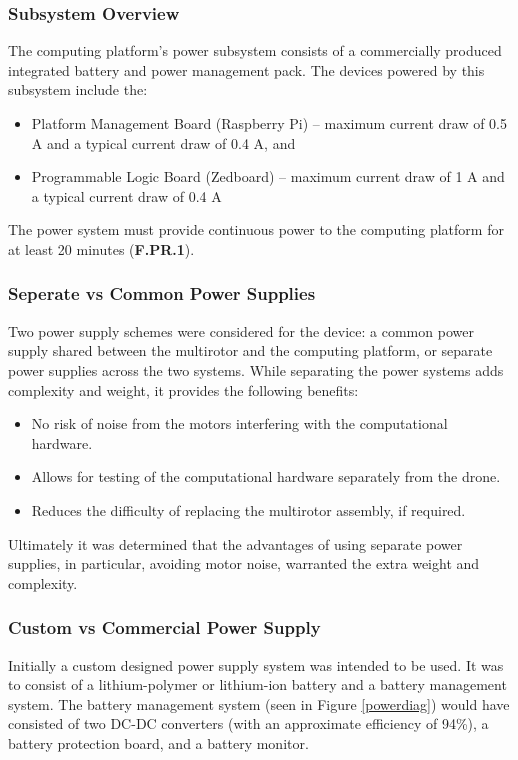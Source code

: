 \subsubsection{Subsystem Overview}
The computing platform's power subsystem consists of a commercially produced integrated battery and power management pack. The devices powered by this subsystem include the:

\begin{itemize}
\item Platform Management Board (Raspberry Pi) -- maximum current draw of 0.5 A and a typical current draw of 0.4 A, and
\item Programmable Logic Board (Zedboard) -- maximum current draw of 1 A and a typical current draw of 0.4 A
\end{itemize}

The power system must provide continuous power to the computing platform for at least 20 minutes (\textbf{F.PR.1}).

\subsubsection{Seperate vs Common Power Supplies}
Two power supply schemes were considered for the device: a common power supply shared between the multirotor and the computing platform, or separate power supplies across the two systems. While separating the power systems adds complexity and weight, it provides the following benefits:

\begin{itemize}
    \item No risk of noise from the motors interfering with the computational hardware.
    \item Allows for testing of the computational hardware separately from the drone.
    \item Reduces the difficulty of replacing the multirotor assembly, if required.
\end{itemize}

Ultimately it was determined that the advantages of using separate power supplies, in particular, avoiding motor noise, warranted the extra weight and complexity.

\subsubsection{Custom vs Commercial Power Supply}
Initially a custom designed power supply system was intended to be used. It was to consist of a lithium-polymer or lithium-ion battery and a battery management system. The battery management system (seen in Figure \ref{powerdiag}) would have consisted of two DC-DC converters (with an approximate efficiency of 94\%), a battery protection board, and a battery monitor. 

